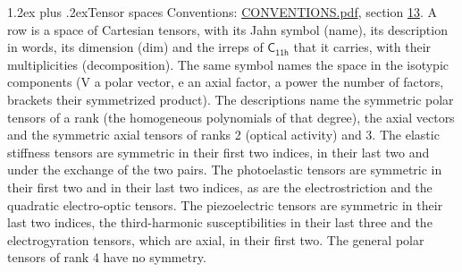 \documentclass[10pt,a4paper]{article}
\makeatletter
\renewcommand\section{\@startsection{section}{1}{\z@}{-3ex plus -1ex minus -.2ex}%
  {1.2ex plus .2ex}{\normalfont\large\sffamily\bfseries\color{parttitle}}}
\numberwithin{equation}{section}
\newcommand{\grp}[1]{\mathsf{#1}}
\makeatother
\begin{document}
\section{Tensor spaces}\label{s:tensor_spaces}
Conventions: \href{../../CONVENTIONS.pdf}{CONVENTIONS.pdf}, section \href{../../CONVENTIONS.pdf\#conv.13}{13}.
\leavevmode\label{n:head.name}\label{n:head.description}\label{n:head.dim}\label{n:head.decomposition}A row is a space of Cartesian tensors, with its Jahn symbol (name), its description in words, its dimension (dim) and the irreps of $\grp{C_{11h}}$ that it carries, with their multiplicities (decomposition). \label{n:label.jahn}The same symbol names the space in the isotypic components (V a polar vector, e an axial factor, a power the number of factors, brackets their symmetrized product). The descriptions name the symmetric polar tensors of a rank (the homogeneous polynomials of that degree), the axial vectors and the symmetric axial tensors of ranks 2 (optical activity) and 3. The elastic stiffness tensors are symmetric in their first two indices, in their last two and under the exchange of the two pairs. The photoelastic tensors are symmetric in their first two and in their last two indices, as are the electrostriction and the quadratic electro-optic tensors. The piezoelectric tensors are symmetric in their last two indices, the third-harmonic susceptibilities in their last three and the electrogyration tensors, which are axial, in their first two. The general polar tensors of rank 4 have no symmetry.
\end{document}
